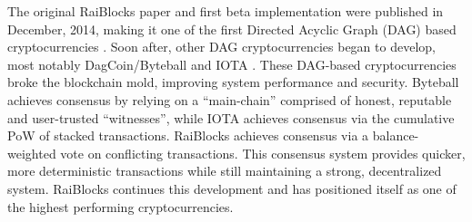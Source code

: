 The original RaiBlocks paper and first beta implementation were published in December, 2014, making it one of the first Directed Acyclic Graph (DAG) based cryptocurrencies \cite{Colin_original_raiblocks}. Soon after, other DAG cryptocurrencies began to develop, most notably DagCoin/Byteball and IOTA \cite{Ribero_dagcoin:a, Popov_tangle:a}. These DAG-based cryptocurrencies broke the blockchain mold, improving system performance and security. Byteball achieves consensus by relying on a ``main-chain'' comprised of honest, reputable and user-trusted ``witnesses'', while IOTA achieves consensus via the cumulative PoW of stacked transactions. RaiBlocks achieves consensus via a balance-weighted vote on conflicting transactions. This consensus system provides quicker, more deterministic transactions while still maintaining a strong, decentralized system. RaiBlocks continues this development and has positioned itself as one of the highest performing cryptocurrencies.

